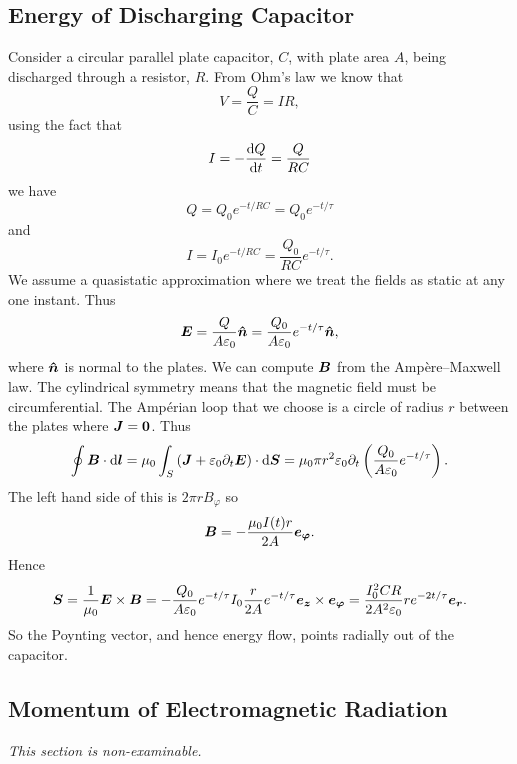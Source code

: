     \subsection{Energy of Discharging Capacitor}
    Consider a circular parallel plate capacitor, \(C\), with plate area \(A\), being discharged through a resistor, \(R\).
    From Ohm's law we know that
    \[V = \frac{Q}{C} = IR,\]
    using the fact that
    \[I = -\dv{Q}{t} = \frac{Q}{RC}\]
    we have
    \[Q = Q_0e^{-t/RC} = Q_0e^{-t/\tau}\]
    and
    \[I = I_0e^{-t/RC} = \frac{Q_0}{RC}e^{-t/\tau}.\]
    We assume a quasistatic approximation where we treat the fields as static at any one instant.
    Thus
    \[\bm{E} = \frac{Q}{A\varepsilon_0}\bm{\hat{n}} = \frac{Q_0}{A\varepsilon_0}e^{-t/\tau}\bm{\hat{n}},\]
    where \(\bm{\hat{n}}\) is normal to the plates.
    We can compute \(\bm{B}\) from the Amp\`ere--Maxwell law.
    The cylindrical symmetry means that the magnetic field must be circumferential.
    The Amp\'erian loop that we choose is a circle of radius \(r\) between the plates where \(\bm{J} = \bm{0}\).
    Thus
    \[\oint\bm{B}\cdot\dd{\bm{l}} = \mu_0 \int_S \left(\bm{J} + \varepsilon_0\partial_t\bm{E}\right)\cdot\dd{\bm{S}} = \mu_0\pi r^2\varepsilon_0\partial_t \left(\frac{Q_0}{A\varepsilon_0}e^{-t/\tau}\right).\]
    The left hand side of this is \(2\pi rB_{\varphi}\) so
    \[\bm{B} = -\frac{\mu_0 I(t)r}{2A}\bm{e_{\varphi}}.\]
    Hence
    \[\bm{S} = \frac{1}{\mu_0}\bm{E}\times\bm{B} = -\frac{Q_0}{A\varepsilon_0}e^{-t/\tau}I_0\frac{r}{2A}e^{-t/\tau}\bm{e_{z}}\times\bm{e_{\varphi}} = \frac{I_0^2CR}{2A^2\varepsilon_0}re^{-2t/\tau}\bm{e_{r}}.\]
    So the Poynting vector, and hence energy flow, points radially out of the capacitor.
    
    \subsection{Momentum of Electromagnetic Radiation}
    \textit{This section is non-examinable.}
    
